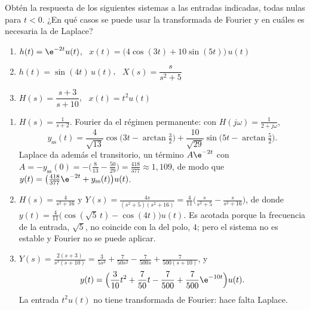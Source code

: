 \documentclass[11pt,a4paper]{scrartcl}
\begin{document}
\begin{ejercicio}
  Obtén la respuesta de los siguientes sistemas a las entradas indicadas, todas nulas para $t<0$. ¿En qué casos se puede usar la transformada de Fourier y en cuáles es necesaria la de Laplace?
  \begin{enumerate}[label=\alph*)]
    \item $h(t)=\e^{-2t}u(t)$, \ $x(t)=\big(4\cos(3t)+10\sin(5t)\big)\,u(t)$
    \item $h(t)=\sin(4t)\,u(t)$, \ $X(s)=\dfrac{s}{s^2+5}$
    \item $H(s)=\dfrac{s+3}{s+10}$, \ $x(t)=t^2u(t)$
  \end{enumerate}
\end{ejercicio}
\begin{solucion}
  \begin{enumerate}[label=\alph*)]
    \item $H(s)=\frac{1}{s+2}$. Fourier da el régimen permanente: con $H(j\omega)=\frac{1}{2+j\omega}$,
    \[
      y_{\mathrm{ss}}(t)=\frac{4}{\sqrt{13}}\cos\big(3t-\arctan\tfrac32\big)+\frac{10}{\sqrt{29}}\sin\big(5t-\arctan\tfrac52\big).
    \]
    Laplace da además el transitorio, un término $A\e^{-2t}$ con $A=-y_{\mathrm{ss}}(0)=-\big(\frac{8}{13}-\frac{50}{29}\big)=\frac{418}{377}\approx1{,}109$, de modo que $y(t)=\big(\frac{418}{377}\e^{-2t}+y_{\mathrm{ss}}(t)\big)u(t)$.
    \item $H(s)=\frac{4}{s^2+16}$ y $Y(s)=\frac{4s}{(s^2+5)(s^2+16)}=\frac{4}{11}\Big(\frac{s}{s^2+5}-\frac{s}{s^2+16}\Big)$, de donde $y(t)=\frac{4}{11}\big(\cos(\sqrt5\,t)-\cos(4t)\big)u(t)$. Es acotada porque la frecuencia de la entrada, $\sqrt5$, no coincide con la del polo, $4$; pero el sistema no es estable y Fourier no se puede aplicar.
    \item $Y(s)=\frac{2(s+3)}{s^3(s+10)}=\frac{3}{5s^3}+\frac{7}{50s^2}-\frac{7}{500s}+\frac{7}{500(s+10)}$, y
    \[
      y(t)=\Big(\frac{3}{10}t^2+\frac{7}{50}t-\frac{7}{500}+\frac{7}{500}\e^{-10t}\Big)u(t).
    \]
    La entrada $t^2u(t)$ no tiene transformada de Fourier: hace falta Laplace.
  \end{enumerate}
\end{solucion}
\end{document}
